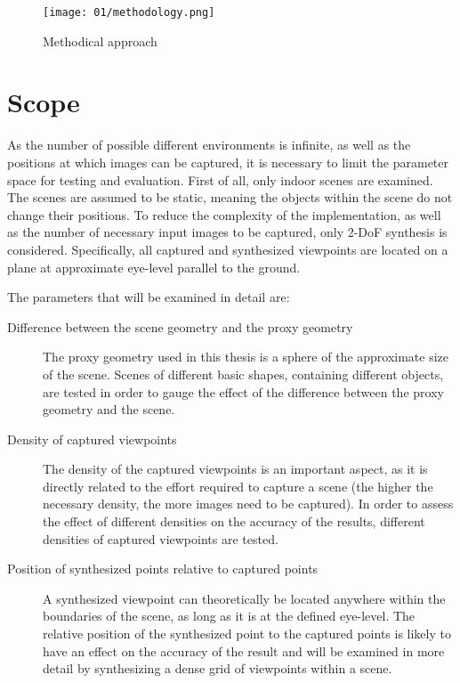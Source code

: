 \begin{figure}
		\centering
		\texttt{[image: 01/methodology.png]}
		\caption{Methodical approach}
		\label{fig:methodology}
\end{figure}


\section*{Scope}
As the number of possible different environments is infinite, as well as the positions at which images can be captured, it is necessary to limit the parameter space for testing and evaluation. First of all, only indoor scenes are examined. The scenes are assumed to be static, meaning the objects within the scene do not change their positions. To reduce the complexity of the implementation, as well as the number of necessary input images to be captured, only 2-DoF synthesis is considered. Specifically, all captured and synthesized viewpoints are located on a plane at approximate eye-level parallel to the ground. 

\noindent
The parameters that will be examined in detail are:
\begin{description}
  \item[Difference between the scene geometry and the proxy geometry] The proxy geometry used in this thesis is a sphere of the approximate size of the scene. Scenes of different basic shapes, containing different objects, are tested in order to gauge the effect of the difference between the proxy geometry and the scene.
  \item[Density of captured viewpoints] The density of the captured viewpoints is an important aspect, as it is directly related to the effort required to capture a scene (the higher the necessary density, the more images need to be captured). In order to assess the effect of different densities on the accuracy of the results, different densities of captured viewpoints are tested.
  \item[Position of synthesized points relative to captured points] A synthesized viewpoint can theoretically be located anywhere within the boundaries of the scene, as long as it is at the defined eye-level. The relative position of the synthesized point to the captured points is likely to have an effect on the accuracy of the result and will be examined in more detail by synthesizing a dense grid of viewpoints within a scene.
\end{description}

